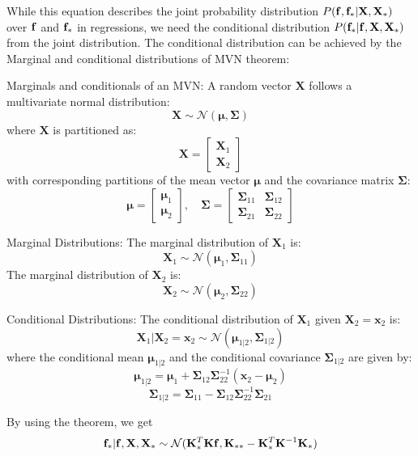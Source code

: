 While this equation describes the joint probability distribution $P({\mathbf{f}}, {\mathbf{f}}_*|\mathbf{X}, \mathbf{X}_*)$ over ${\mathbf{f}}$ and ${\mathbf{f}}_*$ in regressions, we need the conditional distribution $P({\mathbf{f}}_*|{\mathbf{f}}, \mathbf{X}, \mathbf{X}_*)$ from the joint distribution. The conditional distribution can be achieved by the Marginal and conditional distributions of MVN theorem:

\begin{theorem} Marginals and conditionals of an MVN:
A random vector \(\mathbf{X}\) follows a multivariate normal distribution:
\[
\mathbf{X} \sim \mathcal{N}(\mathbf{\mu}, \mathbf{\Sigma})
\]
where \(\mathbf{X}\) is partitioned as:
\[
\mathbf{X} = \begin{bmatrix}
\mathbf{X}_1 \\
\mathbf{X}_2
\end{bmatrix}
\]
with corresponding partitions of the mean vector \(\mathbf{\mu}\) and the covariance matrix \(\mathbf{\Sigma}\):
\[
\mathbf{\mu} = \begin{bmatrix}
\mathbf{\mu}_1 \\
\mathbf{\mu}_2
\end{bmatrix}, \quad
\mathbf{\Sigma} = \begin{bmatrix}
\mathbf{\Sigma}_{11} & \mathbf{\Sigma}_{12} \\
\mathbf{\Sigma}_{21} & \mathbf{\Sigma}_{22}
\end{bmatrix}
\]

Marginal Distributions:
The marginal distribution of \(\mathbf{X}_1\) is:
\[
\mathbf{X}_1 \sim \mathcal{N}(\mathbf{\mu}_1, \mathbf{\Sigma}_{11})
\]
The marginal distribution of \(\mathbf{X}_2\) is:
\[
\mathbf{X}_2 \sim \mathcal{N}(\mathbf{\mu}_2, \mathbf{\Sigma}_{22})
\]

Conditional Distributions:
The conditional distribution of \(\mathbf{X}_1\) given \(\mathbf{X}_2 = \mathbf{x}_2\) is:
\[
\mathbf{X}_1 | \mathbf{X}_2 = \mathbf{x}_2 \sim \mathcal{N}(\mathbf{\mu}_{1|2}, \mathbf{\Sigma}_{1|2})
\]
where the conditional mean \(\mathbf{\mu}_{1|2}\) and the conditional covariance \(\mathbf{\Sigma}_{1|2}\) are given by:
\[
\mathbf{\mu}_{1|2} = \mathbf{\mu}_1 + \mathbf{\Sigma}_{12}\mathbf{\Sigma}_{22}^{-1} (\mathbf{x}_2 - \mathbf{\mu}_2)
\]
\[
\mathbf{\Sigma}_{1|2} = \mathbf{\Sigma}_{11} - \mathbf{\Sigma}_{12}\mathbf{\Sigma}_{22}^{-1}\mathbf{\Sigma}_{21}
\]

\end{theorem}

By using the theorem, we get
$${\mathbf{f}}_*|{\mathbf{f}}, \mathbf{X}, \mathbf{X}_*\sim \mathcal{N}(\mathbf{K}_*^T\mathbf{K}{\mathbf{f}}, \mathbf{K}_{**}-\mathbf{K}_*^T\mathbf{K}^{-1}\mathbf{K}_{*})$$

